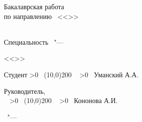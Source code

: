 \begin{center}
{%
Бакалаврская работа \\
по направлению \thesisSpecialtyNumber\ 
<<\thesisSpecialtyTitle>>
}
\\
\textbf {%
\thesisTitle}
\\
{\ProgModule}

\vspace{0pt plus2fill} %

\ifdefined\thesisSpecialtyTwoNumber
{%
Специальность \thesisSpecialtyTwoNumber\ "--- 

<<\thesisSpecialtyTwoTitle>>
}
\fi

\vspace{0pt plus2fill} %
\end{center}
%
\vspace{0pt plus4fill} %
\begin{flushleft}

Студент 
\newcount\lineblank
{}
\loop
  \message{\ }
    \advance {}
    \ifnum \lineblank>0
    \repeat
\
\line(10,0){200} \
\newcount\mynameblank
{}
\loop
  \message{\ }
    \advance {}
    \ifnum \mynameblank>0
    \repeat
\
Уманский А.А. %

Руководитель,\\
\supervisorRegaliaShort
\
\newcount\lineblank
{}
\loop
  \message{\ }
    \advance {}
    \ifnum \lineblank>0
    \repeat
\
\line(10,0){200} \
\newcount\mynameblank
\mynameblank=50
\loop
  \message{\ }
    \advance {}
    \ifnum \mynameblank>0
    \repeat
\
Кононова А.И.

\end{flushleft}

%
\vspace{0pt plus4fill} %
{\centering\thesisCity\ "--- \thesisYear\par}

